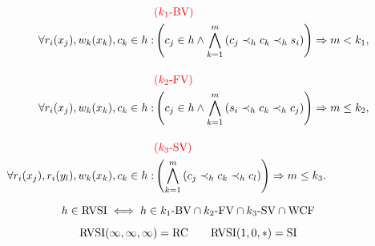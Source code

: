 \begin{frame}{}
  \begin{align*}
    & \textcolor{red}{(k_1\text{-BV}{})} \\
    \forall r_i(x_{j}), w_k(x_k), c_k \in h: 
    & \left(c_j \in h \land \bigwedge_{k=1}^{m} \left(c_j \prec_{h} c_k \prec_{h} s_i \right)\right) \Rightarrow m < k_1, \\[10pt]
    & \textcolor{red}{(k_2\text{-FV}{})} \\
    \forall r_i(x_{j}), w_k(x_k), c_k \in h:
    & \left(c_j \in h \land \bigwedge_{k=1}^{m} \left(s_i \prec_{h} c_k \prec_{h} c_j \right)\right) \Rightarrow m \le k_2, \\[10pt]
    & \textcolor{red}{(k_3\text{-SV}{})} \\
    \forall r_i(x_j), r_i(y_l), w_k(x_k), c_k \in h:
    & \left(\bigwedge_{k=1}^{m} \left(c_j \prec_{h} c_k \prec_{h} c_l \right)\right) \Rightarrow m \le k_3.
  \end{align*}
\end{frame}

\begin{frame}{}
  \begin{equation*}
    h \in \text{RVSI}{} \iff h \in k_1\text{-BV}{} \cap k_2\text{-FV}{} \cap k_3\text{-SV}{} \cap \text{WCF}{}
  \end{equation*}

  \vspace{0.50cm}
  \[
    \text{RVSI}(\infty,\infty,\infty) = \text{RC} \qquad \text{RVSI}(1,0,\ast) = \text{SI}
  \]
\end{frame}

